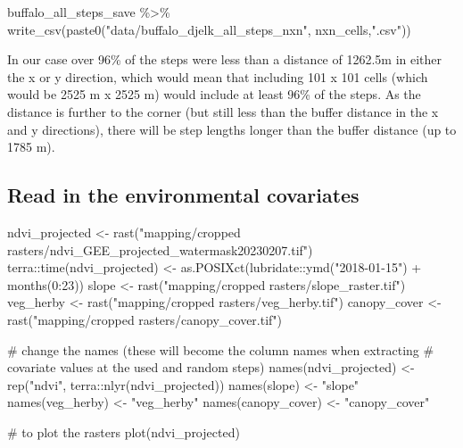 \documentclass[
  letterpaper,
  DIV=11,
  numbers=noendperiod]{scrartcl}
\newenvironment{Shaded}{\begin{snugshade}}{\end{snugshade}}
\newcommand{\CommentTok}[1]{\textcolor[rgb]{0.37,0.37,0.37}{#1}}
\newcommand{\DecValTok}[1]{\textcolor[rgb]{0.68,0.00,0.00}{#1}}
\newcommand{\FunctionTok}[1]{\textcolor[rgb]{0.28,0.35,0.67}{#1}}
\newcommand{\NormalTok}[1]{\textcolor[rgb]{0.00,0.23,0.31}{#1}}
\newcommand{\OtherTok}[1]{\textcolor[rgb]{0.00,0.23,0.31}{#1}}
\newcommand{\SpecialCharTok}[1]{\textcolor[rgb]{0.37,0.37,0.37}{#1}}
\newcommand{\StringTok}[1]{\textcolor[rgb]{0.13,0.47,0.30}{#1}}
\begin{document}
\begin{Shaded}
\begin{Highlighting}[]
\NormalTok{buffalo\_all\_steps\_save }\SpecialCharTok{\%\textgreater{}\%} \FunctionTok{write\_csv}\NormalTok{(}\FunctionTok{paste0}\NormalTok{(}\StringTok{"data/buffalo\_djelk\_all\_steps\_nxn"}\NormalTok{, nxn\_cells,}\StringTok{".csv"}\NormalTok{))}
\end{Highlighting}
\end{Shaded}

In our case over 96\% of the steps were less than a distance of 1262.5m
in either the x or y direction, which would mean that including 101 x
101 cells (which would be 2525 m x 2525 m) would include at least 96\%
of the steps. As the distance is further to the corner (but still less
than the buffer distance in the x and y directions), there will be step
lengths longer than the buffer distance (up to 1785 m).

\subsection{Read in the environmental
covariates}\label{read-in-the-environmental-covariates}

\begin{Shaded}
\begin{Highlighting}[]
\NormalTok{ndvi\_projected }\OtherTok{\textless{}{-}} \FunctionTok{rast}\NormalTok{(}\StringTok{"mapping/cropped rasters/ndvi\_GEE\_projected\_watermask20230207.tif"}\NormalTok{)}
\NormalTok{terra}\SpecialCharTok{::}\FunctionTok{time}\NormalTok{(ndvi\_projected) }\OtherTok{\textless{}{-}} \FunctionTok{as.POSIXct}\NormalTok{(lubridate}\SpecialCharTok{::}\FunctionTok{ymd}\NormalTok{(}\StringTok{"2018{-}01{-}15"}\NormalTok{) }\SpecialCharTok{+} \FunctionTok{months}\NormalTok{(}\DecValTok{0}\SpecialCharTok{:}\DecValTok{23}\NormalTok{))}
\NormalTok{slope }\OtherTok{\textless{}{-}} \FunctionTok{rast}\NormalTok{(}\StringTok{"mapping/cropped rasters/slope\_raster.tif"}\NormalTok{)}
\NormalTok{veg\_herby }\OtherTok{\textless{}{-}} \FunctionTok{rast}\NormalTok{(}\StringTok{"mapping/cropped rasters/veg\_herby.tif"}\NormalTok{)}
\NormalTok{canopy\_cover }\OtherTok{\textless{}{-}} \FunctionTok{rast}\NormalTok{(}\StringTok{"mapping/cropped rasters/canopy\_cover.tif"}\NormalTok{)}

\CommentTok{\# change the names (these will become the column names when extracting }
\CommentTok{\# covariate values at the used and random steps)}
\FunctionTok{names}\NormalTok{(ndvi\_projected) }\OtherTok{\textless{}{-}} \FunctionTok{rep}\NormalTok{(}\StringTok{"ndvi"}\NormalTok{, terra}\SpecialCharTok{::}\FunctionTok{nlyr}\NormalTok{(ndvi\_projected))}
\FunctionTok{names}\NormalTok{(slope) }\OtherTok{\textless{}{-}} \StringTok{"slope"}
\FunctionTok{names}\NormalTok{(veg\_herby) }\OtherTok{\textless{}{-}} \StringTok{"veg\_herby"}
\FunctionTok{names}\NormalTok{(canopy\_cover) }\OtherTok{\textless{}{-}} \StringTok{"canopy\_cover"}

\CommentTok{\# to plot the rasters}
\FunctionTok{plot}\NormalTok{(ndvi\_projected)}
\end{Highlighting}
\end{Shaded}
\end{document}

